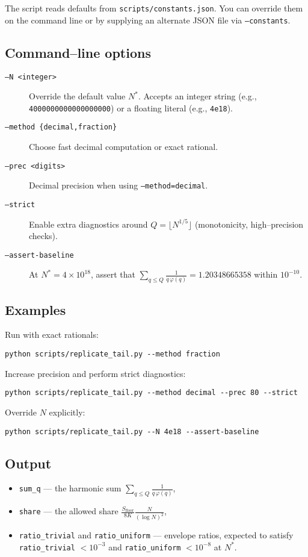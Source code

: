 \documentclass[11pt]{article}
\theoremstyle{remark}
\begin{document}
The script reads defaults from \texttt{scripts/constants.json}. You can override
them on the command line or by supplying an alternate JSON file via \texttt{--constants}.

\subsection*{Command--line options}
\begin{description}
  \item[\texttt{--N \textless integer\textgreater}] Override the default value $N^*$.
        Accepts an integer string (e.g., \texttt{4000000000000000000}) or a floating literal (e.g., \texttt{4e18}).
  \item[\texttt{--method \{decimal,fraction\}}] Choose fast decimal computation or exact rational.
  \item[\texttt{--prec \textless digits\textgreater}] Decimal precision when using \texttt{--method=decimal}.
  \item[\texttt{--strict}] Enable extra diagnostics around $Q=\lfloor N^{1/5}\rfloor$ (monotonicity, high--precision checks).
  \item[\texttt{--assert-baseline}] At $N^*=4\times 10^{18}$, assert that $\sum_{q\le Q}\frac{1}{q\,\varphi(q)}=1.20348665358$ within $10^{-10}$.
\end{description}

\subsection*{Examples}
Run with exact rationals:
\begin{verbatim}
python scripts/replicate_tail.py --method fraction
\end{verbatim}

Increase precision and perform strict diagnostics:
\begin{verbatim}
python scripts/replicate_tail.py --method decimal --prec 80 --strict
\end{verbatim}

Override $N$ explicitly:
\begin{verbatim}
python scripts/replicate_tail.py --N 4e18 --assert-baseline
\end{verbatim}

\subsection*{Output}
\begin{itemize}
  \item \texttt{sum\_q} --- the harmonic sum $\displaystyle \sum_{q\le Q}\frac{1}{q\,\varphi(q)}$,
  \item \texttt{share} --- the allowed share $\displaystyle \frac{S_{\text{floor}}}{8K}\frac{N}{(\log N)^2}$,
  \item \texttt{ratio\_trivial} and \texttt{ratio\_uniform} --- envelope ratios, expected to satisfy
        \texttt{ratio\_trivial} $<10^{-3}$ and \texttt{ratio\_uniform} $<10^{-8}$ at $N^*$.
\end{itemize}
\end{document}

